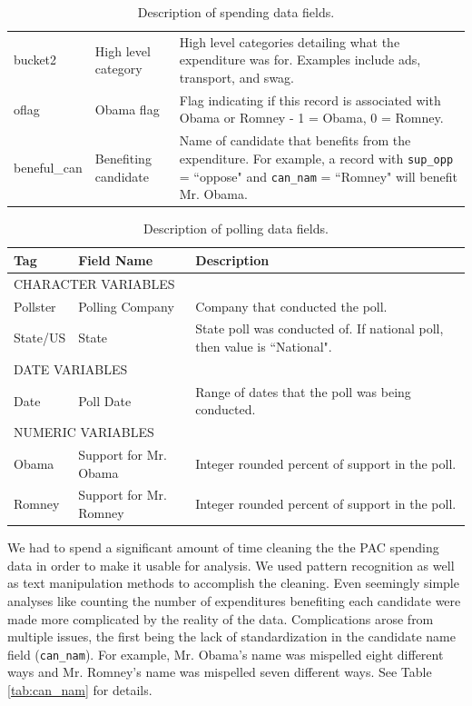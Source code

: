 \documentclass[11pt]{article}\usepackage{graphicx, color}
\begin{document}
\begin{table}[h!]
\begin{tabular}[\textwidth]{l l p{}}
bucket2 & High level category & High level categories detailing what the expenditure was for. Examples include ads, transport, and swag.\\
oflag & Obama flag & Flag indicating if this record is associated with Obama or Romney - 1 = Obama, 0 = Romney.\\
beneful\_can & Benefiting candidate & Name of candidate that benefits from the expenditure. For example, a record with \texttt{sup\_opp} = ``oppose" and \texttt{can\_nam} = ``Romney" will benefit Mr. Obama.\\
\end{tabular}
\caption{Description of spending data fields.}
\label{tab:spendData}
\end{table}

\begin{table}[h!]
\begin{tabular}{l p{} p{}}
Tag & Field Name & Description\\
\hline
\hline
\multicolumn{3}{l}{\MakeTextUppercase{Character Variables}}\\
\hline
Pollster & Polling Company & Company that conducted the poll. \\
State/US & State & State poll was conducted of. If national poll, then value is ``National".\\
\hline
\multicolumn{3}{l}{\MakeTextUppercase{Date Variables}}\\
\hline
Date & Poll Date & Range of dates that the poll was being conducted.\\
\hline
\multicolumn{3}{l}{\MakeTextUppercase{Numeric Variables}}\\
\hline
Obama & Support for Mr. Obama & Integer rounded percent of support in the poll. \\
Romney & Support for Mr. Romney & Integer rounded percent of support in the poll.
\end{tabular}
\caption{Description of polling data fields.}
\label{tab:pollData}
\end{table}

We had to spend a significant amount of time cleaning the the PAC spending data in order to make it usable for analysis. We used pattern recognition as well as text manipulation methods to accomplish the cleaning. Even seemingly simple analyses like counting the number of expenditures benefiting each candidate were made more complicated by the reality of the data. Complications arose from multiple issues, the first being the lack of standardization in the candidate name field (\texttt{can\_nam}). For example, Mr. Obama's name was mispelled eight different ways and Mr. Romney's name was mispelled seven different ways. See Table \ref{tab:can_nam} for details. 
\end{document}
